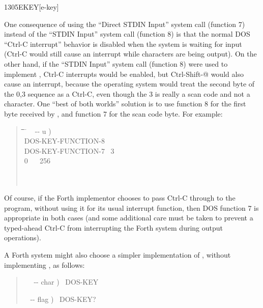 \begin{worddef}{1305}{EKEY}[e-key]
\begin{rationale}
		One consequence of using the ``Direct STDIN Input'' system call
		(function 7) instead of the ``STDIN Input'' system call
		(function 8) is that the normal DOS ``Ctrl-C interrupt'' behavior
		is disabled when the system is waiting for input (Ctrl-C would
		still cause an interrupt while characters are being output). On
		the other hand, if the ``STDIN Input'' system call (function 8)
		were used to implement , Ctrl-C interrupts would be
		enabled, but Ctrl-Shift-@ would also cause an interrupt, because
		the operating system would treat the second byte of the 0,3
		sequence as a Ctrl-C, even though the 3 is really a scan code
		and not a character. One ``best of both worlds'' solution is to
		use function 8 for the first byte received by , and
		function 7 for the scan code byte. For example:

		\begin{quote}
			\ttfamily
			\begin{tabbing}
			\tab \= \tab \= \tab \= \tab \= \hspace{7em} \= \kill
			\+ \word{:} ~  -{}- u ) \\
				\+ DOS-KEY-FUNCTION-8~ ~ ~  \\
					DOS-KEY-FUNCTION-7~  3~ \word{=}~  \\
					\>  0~ ~ 256 \word{+}\\
				\- \word{THEN} \\
			\-  \\
			\word{;}
			\end{tabbing}
		\end{quote}

		Of course, if the Forth implementor chooses to pass Ctrl-C
		through to the program, without using it for its usual
		interrupt function, then DOS function 7 is appropriate in both
		cases (and some additional care must be taken to prevent a
		typed-ahead Ctrl-C from interrupting the Forth system during
		output operations).

		A Forth system might also choose a simpler implementation of
		, without implementing , as follows:

		\begin{quote}\ttfamily
			\word{:} ~~  -{}- char )~
				DOS-KEY~
			\word{;}

			\word{:} ~  -{}- flag )~
				DOS-KEY?~ ~
			\word{;}
		\end{quote}


\end{rationale}
\end{worddef}
